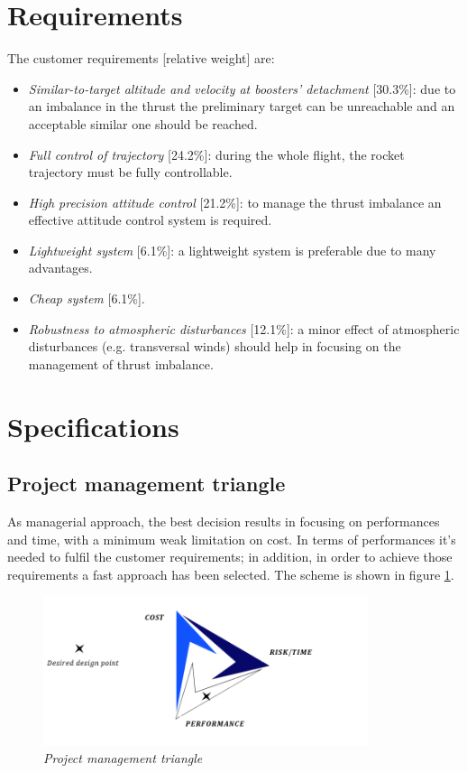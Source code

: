 \documentclass[12pt,fleqn,openany]{book} %
\begin{document}
\section{Requirements}
The customer requirements [relative weight] are: 
\begin{itemize}
 \item \textit{Similar-to-target altitude and velocity at boosters’ detachment }[30.3\%]: due to an imbalance in the thrust the preliminary target can be unreachable and an acceptable similar one should be reached. 
\item \textit{Full control of trajectory} [24.2\%]: during the whole flight, the rocket trajectory must be fully controllable. 
\item \textit{High precision attitude control} [21.2\%]: to manage the thrust imbalance an effective attitude control system is required. 
\item \textit{Lightweight system} [6.1\%]: a lightweight system is preferable due to many advantages. 
\item \textit{Cheap system} [6.1\%]. 
\item \textit{Robustness to atmospheric disturbances} [12.1\%]:  a minor effect of atmospheric disturbances (e.g. transversal winds) should help in focusing on the management of thrust imbalance. 
 \end{itemize}
\section{Specifications}
\subsection{Project management triangle}
As managerial approach, the best decision results in focusing on performances and time, with a minimum weak limitation on cost. In terms of performances it’s needed to fulfil the customer requirements; in addition, in order to achieve those requirements a fast approach has been selected. The scheme is shown in figure \hypertarget{fig:triang}{\ref{fig:triang}}. 
\begin{figure}[h]
 \centering
 \includegraphics[width=0.85\textwidth]{triang}
 \caption{\emph{Project management triangle}}
 \label{fig:triang}
\end{figure}
\newpage
\end{document}
